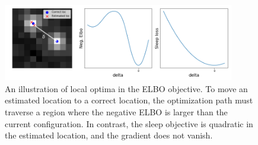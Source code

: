 \begin{figure}[!htb]
    \centering
    \includegraphics[width=0.9\textwidth]{figures/elbo_vs_sleep/local_minima_cartoon.png}
    \vspace{-0.5cm}
    \caption{An illustration of local optima in the ELBO objective. 
    To move an estimated location to a correct location, 
    the optimization path must traverse a region where the negative ELBO is larger than the current configuration. 
    In contrast, the sleep objective is quadratic in the estimated location, and the gradient does not vanish. }
    \label{fig:local_optima_cartoon}
\end{figure}






